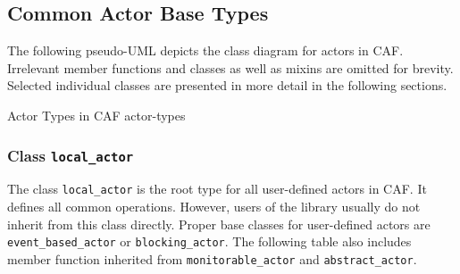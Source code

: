 \clearpage
\subsection{Common Actor Base Types}

The following pseudo-UML depicts the class diagram for actors in CAF.
Irrelevant member functions and classes as well as mixins are omitted for
brevity. Selected individual classes are presented in more detail in the
following sections.

%
          {Actor Types in CAF}%
          {actor-types}

\clearpage
\subsubsection{Class \lstinline^local_actor^}

The class \lstinline^local_actor^ is the root type for all user-defined actors
in CAF. It defines all common operations. However, users of the library
usually do not inherit from this class directly. Proper base classes for
user-defined actors are \lstinline^event_based_actor^ or
\lstinline^blocking_actor^. The following table also includes member function
inherited from \lstinline^monitorable_actor^ and \lstinline^abstract_actor^.

